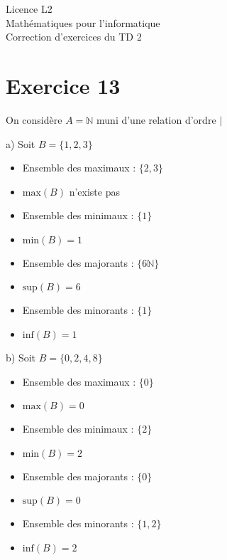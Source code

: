 \documentclass[a4paper,12pt]{article}
\begin{document}
\begin{center}
\Large{Licence L2\\Mathématiques pour l'informatique \\Correction d'exercices du TD 2}
\end{center}

\section*{Exercice 13}

On considère $A = \mathbb{N}$ muni d'une relation d'ordre $|$

\begin{minipage}{0.5\textwidth}
	a) Soit $B = \{1, 2, 3\}$

	\begin{itemize}
		\item Ensemble des maximaux : $\{2, 3\}$
		\item $\text{max}(B)$ n'existe pas
		\item Ensemble des minimaux : $\{1\}$
		\item $\text{min}(B) = 1$
		\item Ensemble des majorants : $\{6\mathbb{N}\}$
		\item $\text{sup}(B) = 6$
		\item Ensemble des minorants : $\{1\}$
		\item $\text{inf}(B) = 1$
	\end{itemize}
\end{minipage}
\begin{minipage}{0.5\textwidth}
	b) Soit $B = \{0, 2, 4, 8\}$

	\begin{itemize}
		\item Ensemble des maximaux : $\{0\}$
		\item $\text{max}(B) = 0$
		\item Ensemble des minimaux : $\{2\}$
		\item $\text{min}(B) = 2$
		\item Ensemble des majorants : $\{0\}$
		\item $\text{sup}(B) = 0$
		\item Ensemble des minorants : $\{1, 2\}$
		\item $\text{inf}(B) = 2$
	\end{itemize}
\end{minipage}
\end{document}
